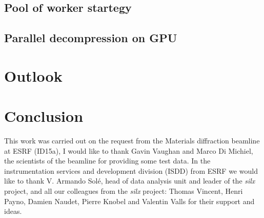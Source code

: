 \documentclass[preprint, pdf]{iucr}              %
\begin{document}
\subsection{Pool of worker startegy} 

\subsection{Parallel decompression on GPU}

\section{Outlook}


\section{Conclusion}

 
This work was carried out on the request from the Materials diffraction beamline 
at ESRF (ID15a), I would like to thank Gavin Vaughan and Marco Di Michiel, the
scientists of the beamline for providing some test data.
In the instrumentation services and development division (ISDD) from ESRF  we
would like to thank V. Armando Solé, head of data analysis unit and leader of 
the \textit{silx} project, and all our colleagues from the \textit{silx}
project:
Thomas Vincent, Henri Payno, Damien Naudet, Pierre Knobel and Valentin Valls for
their support and ideas.



\end{document}

